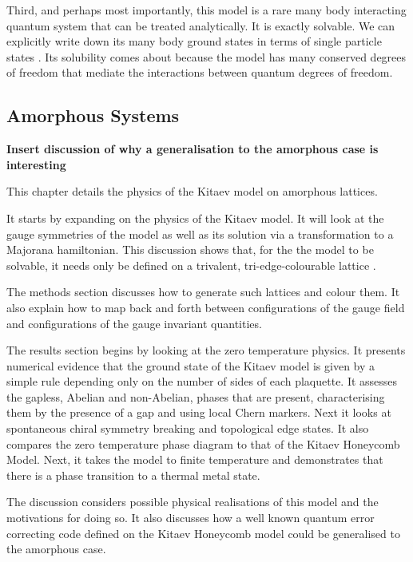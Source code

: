 Third, and perhaps most importantly, this model is a rare many body interacting quantum system that can be treated analytically. It is exactly solvable. We can explicitly write down its many body ground states in terms of single particle states \autocite{kitaevAnyonsExactlySolved2006}. Its solubility comes about because the model has many conserved degrees of freedom that mediate the interactions between quantum degrees of freedom.

\hypertarget{amorphous-systems}{%
\subsection{Amorphous Systems}\label{amorphous-systems}}

\textbf{Insert discussion of why a generalisation to the amorphous case is interesting}

This chapter details the physics of the Kitaev model on amorphous lattices.

It starts by expanding on the physics of the Kitaev model. It will look at the gauge symmetries of the model as well as its solution via a transformation to a Majorana hamiltonian. This discussion shows that, for the the model to be solvable, it needs only be defined on a trivalent, tri-edge-colourable lattice \autocite{Nussinov2009}.

The methods section discusses how to generate such lattices and colour them. It also explain how to map back and forth between configurations of the gauge field and configurations of the gauge invariant quantities.

The results section begins by looking at the zero temperature physics. It presents numerical evidence that the ground state of the Kitaev model is given by a simple rule depending only on the number of sides of each plaquette. It assesses the gapless, Abelian and non-Abelian, phases that are present, characterising them by the presence of a gap and using local Chern markers. Next it looks at spontaneous chiral symmetry breaking and topological edge states. It also compares the zero temperature phase diagram to that of the Kitaev Honeycomb Model. Next, it takes the model to finite temperature and demonstrates that there is a phase transition to a thermal metal state.

The discussion considers possible physical realisations of this model and the motivations for doing so. It also discusses how a well known quantum error correcting code defined on the Kitaev Honeycomb model could be generalised to the amorphous case.

